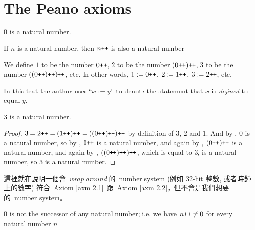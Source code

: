 \section{The Peano axioms}\label{sec 2.1}

\begin{axiom}\label{axm 2.1}
\( 0 \) is a natural number.
\end{axiom}
\begin{axiom}\label{axm 2.2}
If \( n \) is a natural number, then \( n\texttt{++} \) is also a natural number
\end{axiom}

\setcounter{theorem}{2}
\begin{definition}\label{def 2.1.3}
We define \( 1 \) to be the number \( 0\texttt{++} \), \(2\) to be the number \( (0\texttt{++})\texttt{++} \), 3 to be the number \( ((0\texttt{++})\texttt{++})\texttt{++} \), etc.
In other words, \( 1 := 0\texttt{++} \), \( 2 := 1\texttt{++} \), \( 3 := 2\texttt{++} \), etc.
\end{definition}

\begin{note}
In this text the author uses ``\(x := y\)'' to denote the statement that \(x\) is \emph{defined} to equal \(y\).
\end{note}

\begin{proposition}\label{prop 2.1.4}
\(3\) is a natural number.
\end{proposition}
\begin{proof}
\( 3 = 2\texttt{++} = (1\texttt{++})\texttt{++} = ((0\texttt{++})\texttt{++})\texttt{++} \) by definition of \(3\), \(2\) and \(1\). And by , \(0\) is a natural number, so by , \(0\texttt{++}\) is a natural number, and again by , \((0\texttt{++})\texttt{++}\) is a natural number, and again by , \( ((0\texttt{++})\texttt{++})\texttt{++} \), which is equal to \(3\), is a natural number, so \(3\) is a natural number.
\end{proof}

\begin{example}\label{example 2.1.5}
這裡就在說明一個會\ \emph{wrap around} 的\ number system (例如 32-bit 整數, 或者時鐘上的數字) 符合\ Axiom \ref{axm 2.1}\ 跟\ Axiom \ref{axm 2.2}，但不會是我們想要的\ number system。
\end{example}

\begin{axiom}\label{axm 2.3}
\(0\) is not the successor of any natural number; i.e. we have \(n\texttt{++} \neq 0\) for every natural number \(n\)
\end{axiom}

